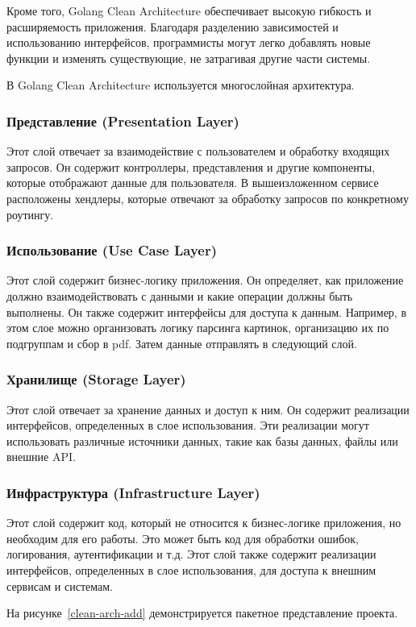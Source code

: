 Кроме того, Golang Clean Architecture обеспечивает высокую гибкость и расширяемость приложения. 
Благодаря разделению зависимостей и использованию интерфейсов, программисты могут легко добавлять новые функции и изменять существующие, не затрагивая другие части системы.

В Golang Clean Architecture используется многослойная архитектура.

\subsubsection{Представление (Presentation Layer)}
Этот слой отвечает за взаимодействие с пользователем и обработку входящих запросов.
Он содержит контроллеры, представления и другие компоненты, которые отображают данные для пользователя.
В вышеизложенном сервисе расположены хендлеры, которые отвечают за обработку запросов по конкретному роутингу.

\subsubsection{Использование (Use Case Layer)}
Этот слой содержит бизнес-логику приложения. 
Он определяет, как приложение должно взаимодействовать с данными и какие операции должны быть выполнены. 
Он также содержит интерфейсы для доступа к данным.
Например, в этом слое можно организовать логику парсинга картинок, организацию их по подгруппам и сбор в pdf.
Затем данные отправлять в следующий слой.

\subsubsection{Хранилище (Storage Layer)}
Этот слой отвечает за хранение данных и доступ к ним. 
Он содержит реализации интерфейсов, определенных в слое использования. 
Эти реализации могут использовать различные источники данных, такие как базы данных, файлы или внешние API.

\subsubsection{Инфраструктура (Infrastructure Layer)}
Этот слой содержит код, который не относится к бизнес-логике приложения, но необходим для его работы. 
Это может быть код для обработки ошибок, логирования, аутентификации и т.д. 
Этот слой также содержит реализации интерфейсов, определенных в слое использования, для доступа к внешним сервисам и системам.

На рисунке~\ref{clean-arch-add} демонстрируется пакетное представление проекта.